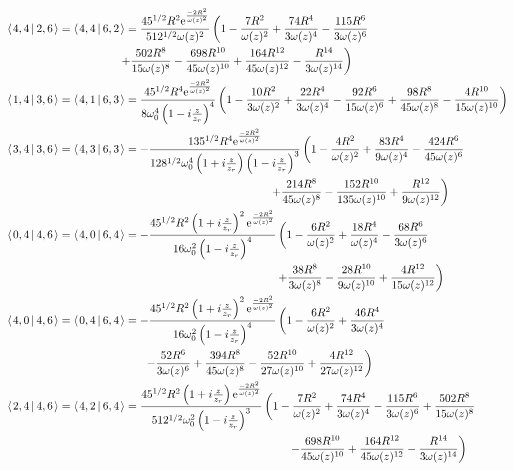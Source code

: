 \documentclass[11pt]{amsart}
\makeatletter
\newcommand{\e}{{\rm e}}				%
\newcommand{\msp}[1]{\mspace{#1mu}}		%
\newcommand{\0}{\varnothing}		%
\newcommand{\brac}[2]{\left\langle\msp{2} #1\left\lvert \msp{3.5} #2 \right.\right\rangle}	%
\newcommand{\1}{!}
\newcommand{\2}{@}
\newcommand{\3}{\#}
\newcommand{\4}{\$}
\newcommand{\5}{\%}
\newcommand{\6}{$^\wedge$}
\newcommand{\7}{\&}
\newcommand{\8}{*}
\newcommand{\9}{(}
\makeatother
\begin{document}
 \begin{align*}
 &
 \brac{4,4}{2,6} = \brac{4,4}{6,2} = \frac{45^{1/2}R^2\e^{\frac{-2R^2}{\omega(z)^2}}}{512^{1/2}\omega(z)^2}\left(1-\frac{7R^2}{\omega(z)^2}+\frac{74R^4}{3\omega(z)^4}-\frac{115R^6}{3\omega(z)^6}\right.
 \\
 &
\msp{180} \left.+\frac{502R^8}{15\omega(z)^8}-\frac{698R^{10}}{45\omega(z)^{10}}+\frac{164R^{12}}{45\omega(z)^{12}}-\frac{R^{14}}{3\omega(z)^{14}}\right)
\\
&
\brac{1,4}{3,6} = \brac{4,1}{6,3} = \frac{45^{1/2}R^4\e^{\frac{-2R^2}{\omega(z)^2}}}{8\omega_0^4\left(1-i\frac{z}{z_r}\right)^4}\left(1-\frac{10R^2}{3\omega(z)^2}+\frac{22R^4}{3\omega(z)^4}-\frac{92R^6}{15\omega(z)^6}+\frac{98R^8}{45\omega(z)^8}-\frac{4R^{10}}{15\omega(z)^{10}}\right)
\\
&
\brac{3,4}{3,6} = \brac{4,3}{6,3} =-\frac{135^{1/2}R^4\e^{\frac{-2R^2}{\omega(z)^2}}}{128^{1/2}\omega_0^4\left(1+i\frac{z}{z_r}\right)\left(1-i\frac{z}{z_r}\right)^3}\left(1-\frac{4R^2}{\omega(z)^2}+\frac{83R^4}{9\omega(z)^4}-\frac{424R^6}{45\omega(z)^6}\right.
\\
&
\msp{420}\left.+\frac{214R^8}{45\omega(z)^8}-\frac{152R^{10}}{135\omega(z)^{10}}+\frac{R^{12}}{9\omega(z)^{12}}\right)
\\
&
\brac{0,4}{4,6} = \brac{4,0}{6,4} = -\frac{45^{1/2}R^2\left(1+i\frac{z}{z_r}\right)^2\e^{\frac{-2R^2}{\omega(z)^2}}}{16\omega_0^2\left(1-i\frac{z}{z_r}\right)^4}\left(1-\frac{6R^2}{\omega(z)^2}+\frac{18R^4}{\omega(z)^4}-\frac{68R^6}{3\omega(z)^6}\right.
\\
&
\left.\msp{430}+\frac{38R^8}{3\omega(z)^8}-\frac{28R^{10}}{9\omega(z)^{10}}+\frac{4R^{12}}{15\omega(z)^{12}}\right)
\\
&
\brac{4,0}{4,6} = \brac{0,4}{6,4} = -\frac{45^{1/2}R^2\left(1+i\frac{z}{z_r}\right)^2\e^{\frac{-2R^2}{\omega(z)^2}}}{16\omega_0^2\left(1-i\frac{z}{z_r}\right)^4}\left(1-\frac{6R^2}{\omega(z)^2}+\frac{46R^4}{3\omega(z)^4}\right.
\\
&
\left.\msp{220}-\frac{52R^6}{3\omega(z)^6}+\frac{394R^8}{45\omega(z)^8}-\frac{52R^{10}}{27\omega(z)^{10}}+\frac{4R^{12}}{27\omega(z)^{12}}\right)
\\
&
\brac{2,4}{4,6} = \brac{4,2}{6,4} = \frac{45^{1/2}R^2\left(1+i\frac{z}{z_r}\right)\e^{\frac{-2R^2}{\omega(z)^2}}}{512^{1/2}\omega_0^2\left(1-i\frac{z}{z_r}\right)^3}\left(1-\frac{7R^2}{\omega(z)^2}+\frac{74R^4}{3\omega(z)^4}-\frac{115R^6}{3\omega(z)^6}+\frac{502R^8}{15\omega(z)^8}
\right.
\\
&
\msp{450}\left. -\frac{698R^{10}}{45\omega(z)^{10}}+\frac{164R^{12}}{45\omega(z)^{12}}-\frac{R^{14}}{3\omega(z)^{14}}\right)

\end{align*}
\end{document}
